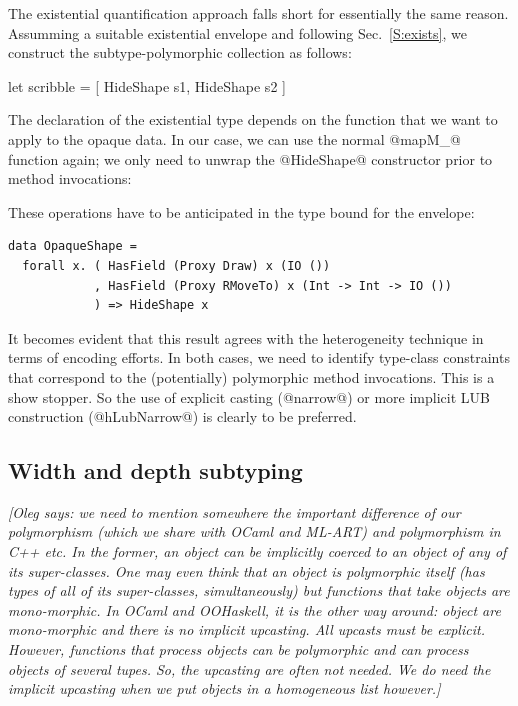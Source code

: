 \documentclass{jfp}
\newcommand{\oleg}[1]{{\it [Oleg says: #1]}}
\begin{document}
The existential quantification approach falls short for essentially
the same reason. Assumming a suitable existential envelope and
following Sec.~\ref{S:exists}, we construct the subtype-polymorphic
collection as follows:

\begin{code}
 let scribble = [ HideShape s1, HideShape s2 ]
\end{code}

The declaration of the existential type depends on the function that
we want to apply to the opaque data. In our case, we can use the
normal @mapM_@ function again; we only need to unwrap the @HideShape@
constructor prior to method invocations:


These operations have to be anticipated in the type bound for the
envelope:

\begin{Verbatim}[fontsize=\small,commandchars=\\\{\}]
 data OpaqueShape =
  forall x. ( HasField (Proxy Draw) x (IO ())
            , HasField (Proxy RMoveTo) x (Int -> Int -> IO ())
            ) => HideShape x
\end{Verbatim}

It becomes evident that this result agrees with the heterogeneity
technique in terms of encoding efforts. In both cases, we need to
identify type-class constraints that correspond to the (potentially)
polymorphic method invocations. This is a show stopper. So the use of
explicit casting (@narrow@) or more implicit LUB construction
(@hLubNarrow@) is clearly to be preferred.






\subsection{Width and depth subtyping}
\label{S:deep}

\oleg{we need to mention somewhere the important difference of our 
polymorphism (which we share with OCaml and ML-ART) and polymorphism
in C++ etc. In the former, an object can be \emph{implicitly} coerced
to an object of any of its super-classes. One may even think that an
object is polymorphic itself (has types of all of its super-classes,
simultaneously) but functions that take objects are mono-morphic.
In OCaml and OOHaskell, it is the other way around: object are
mono-morphic and there is no implicit upcasting. All upcasts must be
explicit. However, functions that process objects can be polymorphic
and can process objects of several tupes. So, the upcasting are
often not needed. We do need the implicit upcasting when we put
objects in a homogeneous list however.}
\end{document}

